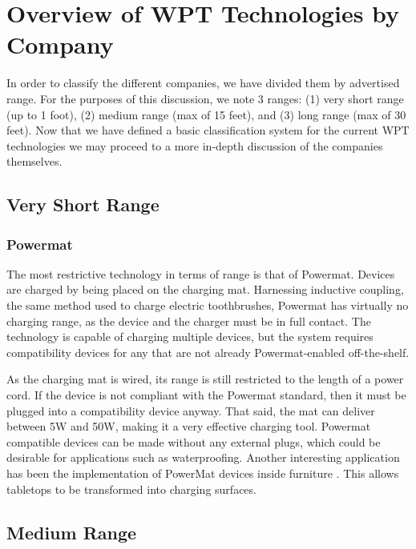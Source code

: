 \section{Overview of WPT Technologies by Company}
\label{sec:lit-review-tech}
In order to classify the different companies, we have divided them by advertised range. For the purposes of this discussion, we note 3 ranges: (1) very short range (up to 1 foot), (2) medium range (max of 15 feet), and (3) long range (max of 30 feet). Now that we have defined a basic classification system for the current WPT technologies we may proceed to a more in-depth discussion of the companies themselves.

\subsection{Very Short Range}
\subsubsection{Powermat}
The most restrictive technology in terms of range is that of Powermat. Devices are charged by being placed on the charging mat. Harnessing inductive coupling, the same method used to charge electric toothbrushes, Powermat has virtually no charging range, as the device and the charger must be in full contact. The technology is capable of charging multiple devices, but the system requires compatibility devices for any that are not already Powermat-enabled off-the-shelf.

As the charging mat is wired, its range is still restricted to the length of a power cord. If the device is not compliant with the Powermat standard, then it must be plugged into a compatibility device anyway. That said, the mat can deliver between 5W and 50W, making it a very effective charging tool. Powermat compatible devices can be made without any external plugs, which could be desirable for applications such as waterproofing. Another interesting application has been the implementation of PowerMat devices inside furniture \cite{rogercheng205}. This allows tabletops to be transformed into charging surfaces. 

\subsection{Medium Range}

